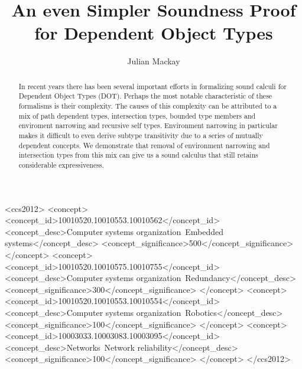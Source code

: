 \documentclass[sigplan, anonymous, review]{acmart}
\begin{document}
\title{An even Simpler Soundness Proof for Dependent Object Types}

\author{Julian Mackay}


\renewcommand{\shortauthors}{B. Trovato et al.}


\begin{abstract}
In recent years there has been several important efforts in formalizing sound calculi for Dependent Object Types (DOT). Perhaps the most notable characteristic of these formalisms is their complexity. The causes of this complexity can be attributed to a mix of path dependent types, intersection types, bounded type members and enviroment narrowing and recursive self types. Environment narrowing in particular makes it difficult to even derive subtype transitivity due to a series of mutually dependent concepts. We demonstrate that removal of environment narrowing and intersection types from this mix can give us a sound calculus that still retains considerable expressiveness.
\end{abstract}

%
%
\begin{CCSXML}
<ccs2012>
 <concept>
  <concept_id>10010520.10010553.10010562</concept_id>
  <concept_desc>Computer systems organization~Embedded systems</concept_desc>
  <concept_significance>500</concept_significance>
 </concept>
 <concept>
  <concept_id>10010520.10010575.10010755</concept_id>
  <concept_desc>Computer systems organization~Redundancy</concept_desc>
  <concept_significance>300</concept_significance>
 </concept>
 <concept>
  <concept_id>10010520.10010553.10010554</concept_id>
  <concept_desc>Computer systems organization~Robotics</concept_desc>
  <concept_significance>100</concept_significance>
 </concept>
 <concept>
  <concept_id>10003033.10003083.10003095</concept_id>
  <concept_desc>Networks~Network reliability</concept_desc>
  <concept_significance>100</concept_significance>
 </concept>
</ccs2012>
\end{CCSXML}
\end{document}
